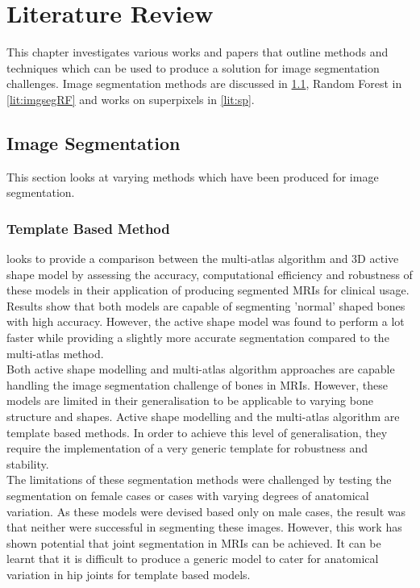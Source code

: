 \chapter{Literature Review}
This chapter investigates various works and papers that outline methods and techniques which can be used to produce a solution for image segmentation challenges. Image segmentation methods are discussed in \ref{lit:imgseg}, Random Forest in \ref{lit:imgsegRF} and works on superpixels in \ref{lit:sp}.

\section{Image Segmentation}
\label{lit:imgseg}
This section looks at varying methods which have been produced for image segmentation.
\subsection{Template Based Method}
\cite{ref:xia2013} looks to provide a comparison between the multi-atlas algorithm and 3D active shape model by assessing the accuracy, computational efficiency and robustness of these models in their application of producing segmented MRIs for clinical usage.
\\[1\baselineskip]
Results show that both models are capable of segmenting 'normal' shaped bones with high accuracy. However, the active shape model was found to perform a lot faster while providing a slightly more accurate segmentation compared to the multi-atlas method. 
\\[1\baselineskip]
Both active shape modelling and multi-atlas algorithm approaches are capable handling the image segmentation challenge of bones in MRIs. However, these models are limited in their generalisation to be applicable to varying bone structure and shapes. Active shape modelling and the multi-atlas algorithm are template based methods. In order to achieve this level of generalisation, they require the implementation of a very generic template for robustness and stability.
\\[1\baselineskip]
The limitations of these segmentation methods were challenged by testing the segmentation on female cases or cases with varying degrees of anatomical variation. As these models were devised based only on male cases, the result was that neither were successful in segmenting these images. However, this work has shown potential that joint segmentation in MRIs can be achieved. It can be learnt that it is difficult to produce a generic model to cater for anatomical variation in hip joints for template based models. 

